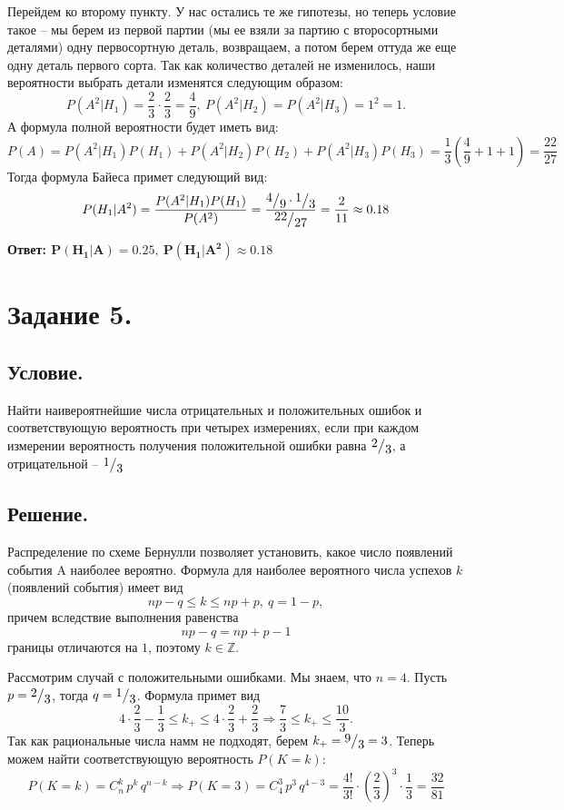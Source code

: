 \documentclass[a4paper, 12pt]{article}
\newcommand{\frc}[2]{\raisebox{2pt}{$#1$}\big/\raisebox{-3pt}{$#2$}}
\begin{document}
    Перейдем ко второму пункту. У нас остались те же гипотезы, но теперь условие такое -- мы берем из первой партии (мы ее взяли за
    партию с второсортными деталями) одну первосортную деталь, возвращаем, а потом берем оттуда же еще одну деталь первого сорта.
    Так как количество деталей не изменилось, наши вероятности выбрать детали изменятся следующим образом:
    $$
    P(A^2|H_1)=\dfrac{2}{3}\cdot\dfrac{2}{3}=\dfrac{4}{9},\ P(A^2|H_2)=P(A^2|H_3)=1^2=1.
    $$
    А формула полной вероятности будет иметь вид:
    $$
    P(A)=P(A^2|H_1)P(H_1)+P(A^2|H_2)P(H_2)+P(A^2|H_3)P(H_3)=\dfrac{1}{3}\left(\dfrac{4}{9}+1+1\right)=\dfrac{22}{27}
    $$
    Тогда формула Байеса примет следующий вид:
    $$
    P(H_1|A^2)=\dfrac{P(A^2|H_1)P(H_1)}{P(A^2)}=\dfrac{\frc{4}{9}\cdot\frc{1}{3}}{\frc{22}{27}}=\dfrac{2}{11}\approx 0.18
    $$


    \textbf{Ответ: $\mathbf{P(H_1|A)=0.25,\ P(H_1|A^2)\approx0.18}$}

    
    \section{Задание 5.}
    \subsection{Условие.}
    Найти наивероятнейшие числа отрицательных и положительных ошибок и соответствующую вероятность при четырех измерениях, если
    при каждом измерении вероятность получения положительной ошибки равна $\frc{2}{3}$, а отрицательной -- $\frc{1}{3}$


    \subsection{Решение.}
    Распределение по схеме Бернулли позволяет установить, какое число появлений события A наиболее вероятно. Формула для
    наиболее вероятного числа успехов $k$ (появлений события) имеет вид $$np-q\leq k \leq np+p,\ q=1-p,$$ причем вследствие
    выполнения равенства $$np-q=np+p-1$$ границы отличаются на $1$, поэтому $k\in \mathbb{Z}$.


    Рассмотрим случай с положительными ошибками. Мы знаем, что $n=4$. Пусть $p=\frc{2}{3}$, тогда $q=\frc{1}{3}$. Формула примет вид
    $$4\cdot\dfrac{2}{3}-\dfrac{1}{3}\leq k_{+}\leq 4\cdot \dfrac{2}{3}+\dfrac{2}{3}\Rightarrow \dfrac{7}{3}\leq k_{+} \leq \dfrac{10}{3}.$$
    Так как рациональные числа намм не подходят, берем $k_{+}=\frc{9}{3}=3$. Теперь можем найти соответствующую вероятность $P\left(K=k\right)$:
    $$
    P\left(K=k\right)=C_{n}^{k}\,p^{k}\,q^{n-k}\Rightarrow P\left(K=3\right)=C_{4}^{3}\,p^{3}\,q^{4-3}=\dfrac{4!}{3!}\cdot\left(\dfrac{2}{3}\right)^{3}\cdot\dfrac{1}{3}=\dfrac{32}{81}
    $$
\end{document}

